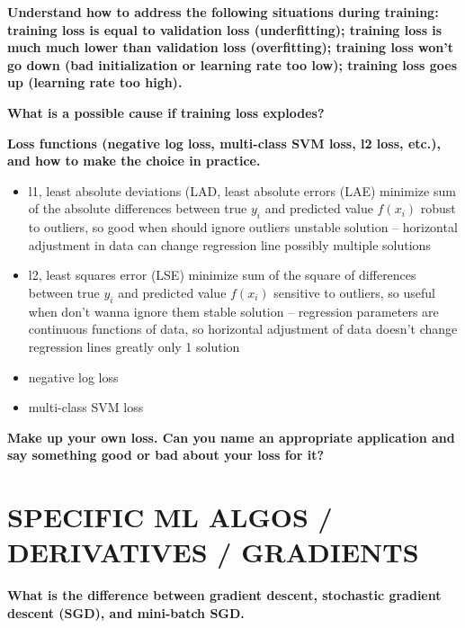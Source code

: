 \documentclass[10pt,letterpaper]{article}
\begin{document}
\subitem \textbf{ Understand how to address the following situations during training: training loss is equal to validation loss (underfitting); training loss is much much lower than validation loss (overfitting); training loss won’t go down (bad initialization or learning rate too low); training loss goes up (learning rate too high).}
\begin{solution}
\end{solution}

\subitem \textbf{ What is a possible cause if training loss explodes?}
\begin{solution}
\end{solution}

\subitem \textbf{ Loss functions (negative log loss, multi-class SVM loss, l2 loss, etc.), and how to make the choice in practice.}
\begin{solution}
\begin{itemize}
\item l1, least absolute deviations (LAD, least absolute errors (LAE)
\subitem minimize sum of the absolute differences between true $y_i$ and predicted value $f(x_i)$
\subitem robust to outliers, so good when should ignore outliers
\subitem unstable solution -- horizontal adjustment in data can change regression line 
\subitem possibly multiple solutions
\item l2, least squares error (LSE)
\subitem minimize sum of the square of differences between true $y_i$ and  predicted value $f(x_i)$
\subitem sensitive to outliers, so useful when don't wanna ignore them
\subitem stable solution -- regression parameters are continuous functions of data, so horizontal adjustment of data doesn't change regression lines greatly 
\subitem only 1 solution
\item negative log loss
\item multi-class SVM loss
\end{itemize}
\end{solution}

\subitem \textbf{ Make up your own loss. Can you name an appropriate application and say something good or bad about your loss for it?}
\begin{solution}
\end{solution}

\section{SPECIFIC ML ALGOS / DERIVATIVES / GRADIENTS}
\subitem \textbf{ What is the difference between gradient descent, stochastic gradient descent (SGD), and mini-batch SGD.}
\begin{solution}
\end{solution}
\end{document}
